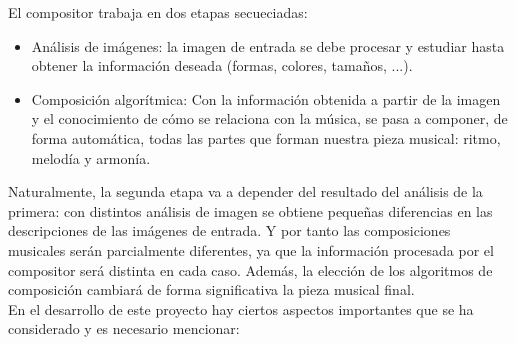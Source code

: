 		El compositor trabaja en dos etapas secueciadas:
		
		\begin{itemize}
		
		\item Análisis de imágenes: la imagen de entrada se debe procesar y estudiar hasta obtener la información deseada (formas, colores, tamaños, ...).

		\item Composición algorítmica: Con la información obtenida a partir de la imagen y el conocimiento de cómo se relaciona con la música, se pasa a componer, de forma automática, todas las partes que forman nuestra pieza musical: ritmo, melodía y armonía.
		\end{itemize}
		
		Naturalmente, la segunda etapa va a depender del resultado del análisis de la primera: con distintos análisis de imagen se obtiene pequeñas diferencias en las descripciones de las imágenes de entrada. Y por tanto las composiciones musicales serán parcialmente diferentes, ya que la información procesada por el compositor será distinta en cada caso. Además, la elección de los algoritmos de composición cambiará de forma significativa la pieza musical final.\\
		
		En el desarrollo de este proyecto hay ciertos aspectos importantes que se ha considerado y es necesario mencionar:	


